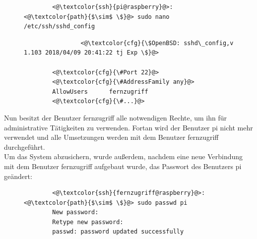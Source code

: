 \documentclass[a4paper, 12pt]{scrartcl}
\begin{document}
\begin{figure}[H]
    \begin{mdframed}[backgroundcolor=bbg]
        \begin{lstlisting}
        <@\textcolor{ssh}{pi@raspberry}@>:<@\textcolor{path}{$\sim$ \$}@> sudo nano /etc/ssh/sshd_config
        \end{lstlisting}
    \end{mdframed}
    \label{lst:nano_sshd_config}
\end{figure}
\begin{figure}[H]
    \begin{mdframed}[backgroundcolor=bbg]
        \begin{lstlisting}
                <@\textcolor{cfg}{\$OpenBSD: sshd\_config,v 1.103 2018/04/09 20:41:22 tj Exp \$}@>    

        <@\textcolor{cfg}{\#Port 22}@>
        <@\textcolor{cfg}{\#AddressFamily any}@>
        AllowUsers      fernzugriff
        <@\textcolor{cfg}{\#...}@>
        \end{lstlisting}
    \end{mdframed}
    \label{lst:fernzugriff_ssh}
\end{figure}
Nun besitzt der Benutzer \glqq fernzugriff\grqq{} alle notwendigen Rechte, um ihn für administrative Tätigkeiten zu verwenden. Fortan wird der Benutzer \glqq pi\grqq{} nicht mehr verwendet und alle
Umsetzungen werden mit dem Benutzer \glqq fernzugriff\grqq{} durchgeführt.
\\
Um das System abzusichern, wurde außerdem, nachdem eine neue Verbindung mit dem Benutzer \glqq fernzugriff\grqq{} aufgebaut wurde, das Passwort des Benutzers \glqq pi\grqq{}
geändert:
\begin{figure}[H]
    \begin{mdframed}[backgroundcolor=bbg]
        \begin{lstlisting}
        <@\textcolor{ssh}{fernzugriff@raspberry}@>:<@\textcolor{path}{$\sim$ \$}@> sudo passwd pi
        New password:
        Retype new password:
        passwd: password updated successfully
        \end{lstlisting}
    \end{mdframed}
    \label{lst:change_pi_passwd}
\end{figure}
\end{document}
